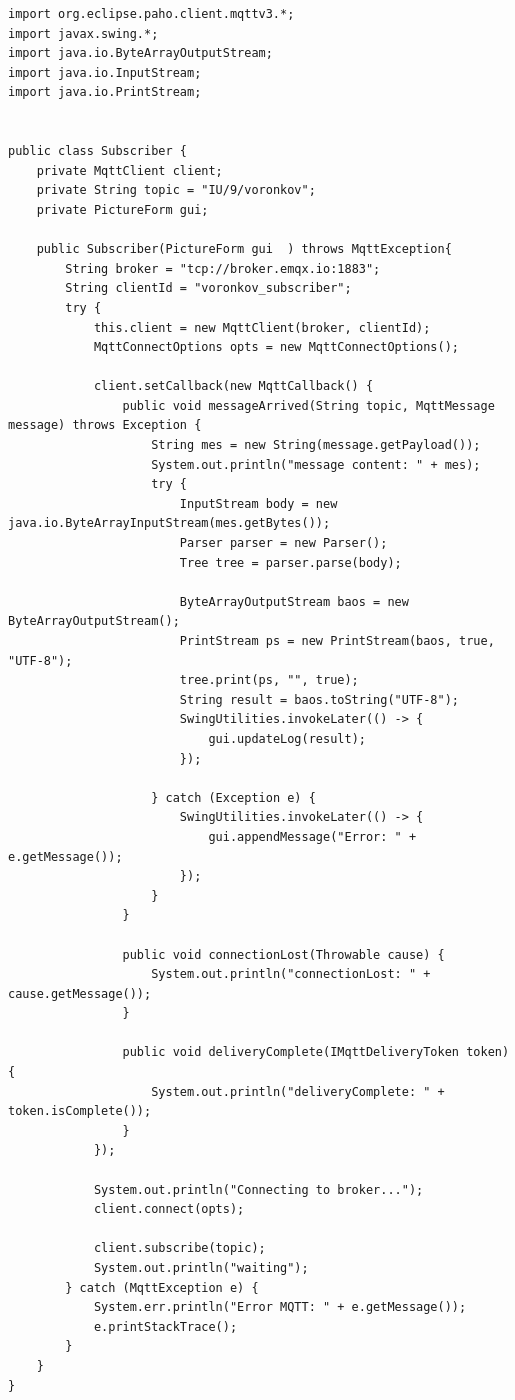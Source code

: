 \documentclass[a4paper, 14pt]{extarticle}
\begin{document}
\begin{lstlisting}
import org.eclipse.paho.client.mqttv3.*;
import javax.swing.*;
import java.io.ByteArrayOutputStream;
import java.io.InputStream;
import java.io.PrintStream;


public class Subscriber {
    private MqttClient client;
    private String topic = "IU/9/voronkov";
    private PictureForm gui;

    public Subscriber(PictureForm gui  ) throws MqttException{
        String broker = "tcp://broker.emqx.io:1883";
        String clientId = "voronkov_subscriber";
        try {
            this.client = new MqttClient(broker, clientId);
            MqttConnectOptions opts = new MqttConnectOptions();

            client.setCallback(new MqttCallback() {
                public void messageArrived(String topic, MqttMessage message) throws Exception {
                    String mes = new String(message.getPayload());
                    System.out.println("message content: " + mes);
                    try {
                        InputStream body = new java.io.ByteArrayInputStream(mes.getBytes());
                        Parser parser = new Parser();
                        Tree tree = parser.parse(body);

                        ByteArrayOutputStream baos = new ByteArrayOutputStream();
                        PrintStream ps = new PrintStream(baos, true, "UTF-8");
                        tree.print(ps, "", true);
                        String result = baos.toString("UTF-8");
                        SwingUtilities.invokeLater(() -> {
                            gui.updateLog(result);
                        });

                    } catch (Exception e) {
                        SwingUtilities.invokeLater(() -> {
                            gui.appendMessage("Error: " + e.getMessage());
                        });
                    }
                }

                public void connectionLost(Throwable cause) {
                    System.out.println("connectionLost: " + cause.getMessage());
                }

                public void deliveryComplete(IMqttDeliveryToken token) {
                    System.out.println("deliveryComplete: " + token.isComplete());
                }
            });

            System.out.println("Connecting to broker...");
            client.connect(opts);

            client.subscribe(topic);
            System.out.println("waiting");
        } catch (MqttException e) {
            System.err.println("Error MQTT: " + e.getMessage());
            e.printStackTrace();
        }
    }
}
\end{lstlisting}
\end{document}
